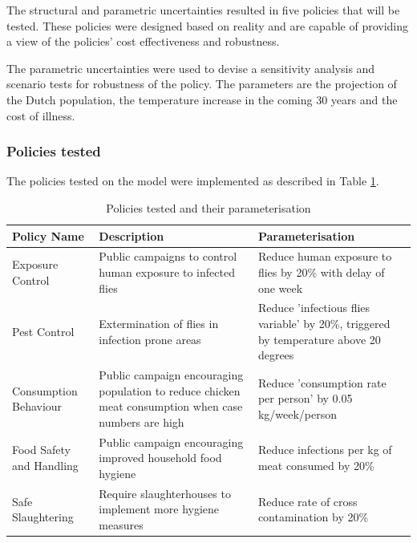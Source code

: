 The structural and parametric uncertainties resulted in five policies that will be tested. These policies were designed based on reality and are capable of providing a view of the policies' cost effectiveness and robustness. 

The parametric uncertainties were used to devise a sensitivity analysis and scenario tests for robustness of the policy. The parameters are the projection of the Dutch population, the temperature increase in the coming 30 years and the cost of illness. 

\subsubsection{Policies tested}

The policies tested on the model were implemented as described in Table \ref{tab:policies}.

\begin{table}[h!]
\centering
\caption{Policies tested and their parameterisation}
\begin{tabular}{ l  p{5cm}  p{5cm}}
\hline
Policy Name &
   Description &
  Parameterisation \\ \hline
Exposure Control &
  Public campaigns to control human exposure to infected flies &
  Reduce human exposure to flies by 20\% with delay of one week \\
Pest Control &
  Extermination of flies in infection prone areas &
  Reduce 'infectious flies variable' by 20\%, triggered by temperature above 20 degrees \\
Consumption Behaviour &
  Public campaign encouraging population to reduce chicken meat consumption when case numbers are high &
  Reduce 'consumption rate per person' by 0.05 kg/week/person \\
Food Safety and Handling &
  Public campaign encouraging improved household food hygiene &
  Reduce infections per kg of meat consumed by 20\% \\
Safe Slaughtering &
  Require slaughterhouses to implement more hygiene measures &
  Reduce rate of cross contamination by 20\% \\ \hline
\end{tabular}
\label{tab:policies}
\end{table}

